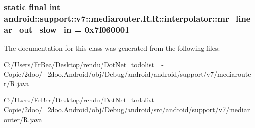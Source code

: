 \hypertarget{classandroid_1_1support_1_1v7_1_1mediarouter_1_1_r_1_1interpolator_d6dcf5456dad60546ea359d790ac11d5}{
\subsubsection[{mr\_\-linear\_\-out\_\-slow\_\-in}]{\setlength{\rightskip}{0pt plus 5cm}static final int android::support::v7::mediarouter.R.R::interpolator::mr\_\-linear\_\-out\_\-slow\_\-in = 0x7f060001}}
\label{classandroid_1_1support_1_1v7_1_1mediarouter_1_1_r_1_1interpolator_d6dcf5456dad60546ea359d790ac11d5}




The documentation for this class was generated from the following files:\begin{CompactItemize}
\item 
C:/Users/FrBea/Desktop/rendu/DotNet\_\-todolist\_ - Copie/2doo/\_\-2doo.Android/obj/Debug/android/android/support/v7/mediarouter/\hyperlink{android_2support_2v7_2mediarouter_2_r_8java}{R.java}\item 
C:/Users/FrBea/Desktop/rendu/DotNet\_\-todolist\_ - Copie/2doo/\_\-2doo.Android/obj/Debug/android/src/android/support/v7/mediarouter/\hyperlink{src_2android_2support_2v7_2mediarouter_2_r_8java}{R.java}\end{CompactItemize}
